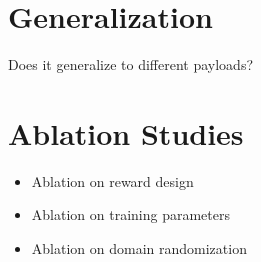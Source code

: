 \section{Generalization}
Does it generalize to different payloads?

\section{Ablation Studies}
\begin{itemize}
    \item Ablation on reward design
    \item Ablation on training parameters
    \item Ablation on domain randomization
    
\end{itemize}